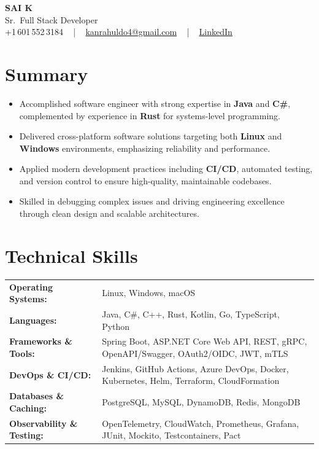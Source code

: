 \documentclass[letterpaper,11pt]{article}
\newcommand{\resumeItem}[1]{
  \item\footnotesize{
    {#1 \vspace{-2pt}}
  }
}
\newcommand{\resumeItemListStart}{\begin{itemize}[leftmargin=*]}
\newcommand{\resumeItemListEnd}{\end{itemize}\vspace{-5pt}}
\begin{document}
\begin{center}
    {\fontsize{14pt}{12pt}\selectfont \textbf{\MakeUppercase{Sai K}}}\\ \vspace{2pt}
    \fontsize{10pt}{12pt}\selectfont Sr.\ Full Stack Developer\\ \vspace{2pt}
    \fontsize{10pt}{12pt}\selectfont +1\,601\,552\,3184 ~ | ~
    \href{mailto:kanrahuldo4@gmail.com}{kanrahuldo4@gmail.com} ~ | ~
    \href{https://www.linkedin.com/in/srrrk/}{\color{blue}\underline{LinkedIn}}
    \vspace{-10pt}
\end{center}

\section{Summary}
\fontsize{9pt}{10pt}\selectfont
\resumeItemListStart
  \resumeItem{Accomplished software engineer with strong expertise in \textbf{Java} and \textbf{C\#}, complemented by experience in \textbf{Rust} for systems-level programming.}
  \resumeItem{Delivered cross-platform software solutions targeting both \textbf{Linux} and \textbf{Windows} environments, emphasizing reliability and performance.}
  \resumeItem{Applied modern development practices including \textbf{CI/CD}, automated testing, and version control to ensure high-quality, maintainable codebases.}
  \resumeItem{Skilled in debugging complex issues and driving engineering excellence through clean design and scalable architectures.}
\resumeItemListEnd
\vspace{-6pt}

\section{Technical Skills}
\vspace{-14pt}
\begin{table}[h]
\fontsize{9pt}{10pt}\selectfont
\begin{tabular}{p{0.3\linewidth} p{0.7\linewidth}}
\textbf{Operating Systems:} & Linux, Windows, macOS \\
\textbf{Languages:} & Java, C\#, C++, Rust, Kotlin, Go, TypeScript, Python \\
\textbf{Frameworks \& Tools:} & Spring Boot, ASP.NET Core Web API, REST, gRPC, OpenAPI/Swagger, OAuth2/OIDC, JWT, mTLS \\
\textbf{DevOps \& CI/CD:} & Jenkins, GitHub Actions, Azure DevOps, Docker, Kubernetes, Helm, Terraform, CloudFormation \\
\textbf{Databases \& Caching:} & PostgreSQL, MySQL, DynamoDB, Redis, MongoDB \\
\textbf{Observability \& Testing:} & OpenTelemetry, CloudWatch, Prometheus, Grafana, JUnit, Mockito, Testcontainers, Pact \\
\end{tabular}
\end{table}
\vspace{-15pt}
\end{document}
